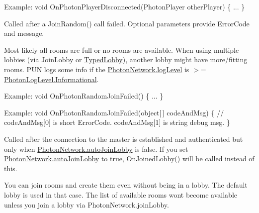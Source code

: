 \begin{Desc}
\begin{description}
Example\+: void On\+Photon\+Player\+Disconnected(\+Photon\+Player other\+Player) \{ ... \} \item[{\em 
On\+Photon\+Random\+Join\+Failed\hypertarget{group__public_api_ggaf30bbea51cc8c4b1ddc239d1c5c1468fad07f29ca1e2135927cf0966873408125}{}\label{group__public_api_ggaf30bbea51cc8c4b1ddc239d1c5c1468fad07f29ca1e2135927cf0966873408125}
}]Called after a Join\+Random() call failed. Optional parameters provide Error\+Code and message. 

Most likely all rooms are full or no rooms are available. When using multiple lobbies (via Join\+Lobby or \hyperlink{class_typed_lobby}{Typed\+Lobby}), another lobby might have more/fitting rooms. P\+UN logs some info if the \hyperlink{class_photon_network_aa7c0c32ec0a25f37438436f10c5bde59}{Photon\+Network.\+log\+Level} is $>$= \hyperlink{group__public_api_ggaf0468f6a0c8ab8caec09678e6dc6f3d5a5391f9a882a54c787b206138ed6d28b0}{Photon\+Log\+Level.\+Informational}.

Example\+: void On\+Photon\+Random\+Join\+Failed() \{ ... \}

Example\+: void On\+Photon\+Random\+Join\+Failed(object\mbox{[}$\,$\mbox{]} code\+And\+Msg) \{ // code\+And\+Msg\mbox{[}0\mbox{]} is short Error\+Code. code\+And\+Msg\mbox{[}1\mbox{]} is string debug msg. \} \item[{\em 
On\+Connected\+To\+Master\hypertarget{group__public_api_ggaf30bbea51cc8c4b1ddc239d1c5c1468fa883ba3af22ed6fc336cde8cb71624d30}{}\label{group__public_api_ggaf30bbea51cc8c4b1ddc239d1c5c1468fa883ba3af22ed6fc336cde8cb71624d30}
}]Called after the connection to the master is established and authenticated but only when \hyperlink{class_photon_network_ad534d4da7222bd8a6d8423cbd238d7f4}{Photon\+Network.\+auto\+Join\+Lobby} is false. If you set \hyperlink{class_photon_network_ad534d4da7222bd8a6d8423cbd238d7f4}{Photon\+Network.\+auto\+Join\+Lobby} to true, On\+Joined\+Lobby() will be called instead of this.

You can join rooms and create them even without being in a lobby. The default lobby is used in that case. The list of available rooms won\textquotesingle{}t become available unless you join a lobby via Photon\+Network.\+join\+Lobby.


\end{description}
\end{Desc}
